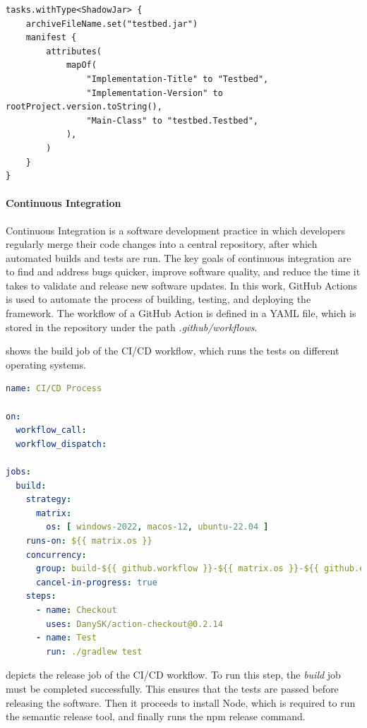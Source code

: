 \documentclass[12pt,a4paper,openright,twoside]{book}
\begin{document}
\begin{lstlisting}[style=my-kotlin, language=my-kotlin, label={lst:custom-task}, caption={Custom task to generate the JAR file.}]
  tasks.withType<ShadowJar> {
    archiveFileName.set("testbed.jar")
    manifest {
        attributes(
            mapOf(
                "Implementation-Title" to "Testbed",
                "Implementation-Version" to rootProject.version.toString(),
                "Main-Class" to "testbed.Testbed",
            ),
        )
    }
}
\end{lstlisting}

\paragraph*{Continuous Integration}
Continuous Integration is a software development practice in which developers regularly merge their code changes into a central repository, after which automated builds and tests are run.
The key goals of continuous integration are to find and address bugs quicker, improve software quality, and reduce the time it takes to validate and release new software updates.
In this work, GitHub Actions is used to automate the process of building, testing, and deploying the framework.
The workflow of a GitHub Action is defined in a YAML file, which is stored in the repository under the path \textit{.github/workflows}.

 shows the build job of the CI/CD workflow, which runs the tests on different operating systems.

\begin{lstlisting}[language=yaml, label={lst:ci-build}, caption={CI/CD workflow: build job.}]
name: CI/CD Process

on:
  workflow_call:
  workflow_dispatch:

jobs:
  build:
    strategy:
      matrix:
        os: [ windows-2022, macos-12, ubuntu-22.04 ]
    runs-on: ${{ matrix.os }}
    concurrency:
      group: build-${{ github.workflow }}-${{ matrix.os }}-${{ github.event.number || github.ref }}
      cancel-in-progress: true
    steps:
      - name: Checkout
        uses: DanySK/action-checkout@0.2.14
      - name: Test
        run: ./gradlew test
\end{lstlisting}

 depicts the release job of the CI/CD workflow.
To run this step, the \emph{build} job must be completed successfully. This ensures that the tests are passed before releasing the software.
Then it proceeds to install Node, which is required to run the semantic release tool, and finally runs the npm release command.
\end{document}
